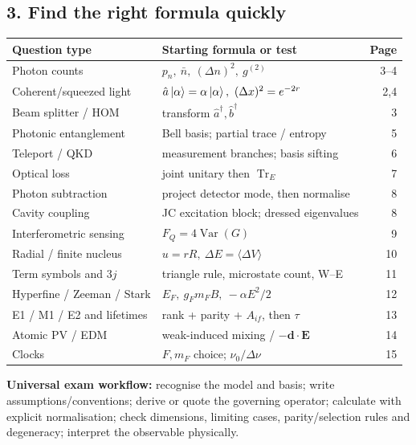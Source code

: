 \subsection*{3. Find the right formula quickly}
\begin{center}\small
\begin{tabularx}{\linewidth}{@{}lXr@{}}\toprule
Question type & Starting formula or test & Page\\\midrule
Photon counts & \(p_n,\ \bar n,\ (\Delta n)^2,\ g^{(2)}\) & 3--4\\
Coherent/squeezed light & \(\hat a\left\lvert \alpha\right\rangle=\alpha\left\lvert \alpha\right\rangle,\ (\Delta x)^2=e^{-2r}\) & 2,4\\
Beam splitter / HOM & transform \(\hat a^\dagger,\hat b^\dagger\) & 3\\
Photonic entanglement & Bell basis; partial trace / entropy & 5\\
Teleport / QKD & measurement branches; basis sifting & 6\\
Optical loss & joint unitary then \(\operatorname{Tr}_E\) & 7\\
Photon subtraction & project detector mode, then normalise & 8\\
Cavity coupling & JC excitation block; dressed eigenvalues & 8\\
Interferometric sensing & \(F_Q=4\operatorname{Var}(G)\) & 9\\
Radial / finite nucleus & \(u=rR,\ \Delta E=\langle\Delta V\rangle\) & 10\\
Term symbols and \(3j\) & triangle rule, microstate count, W--E & 11\\
Hyperfine / Zeeman / Stark & \(E_F,\ g_Fm_FB,\ -\alpha E^2/2\) & 12\\
E1 / M1 / E2 and lifetimes & rank + parity + \(A_{if}\), then \(\tau\) & 13\\
Atomic PV / EDM & weak-induced mixing / \(-\mathbf d\cdot\mathbf E\) & 14\\
Clocks & \(F,m_F\) choice; \(\nu_0/\Delta\nu\) & 15\\\bottomrule
\end{tabularx}
\end{center}
\begin{methodbox}
\textbf{Universal exam workflow:} recognise the model and basis;
write assumptions/conventions; derive or quote the governing operator;
calculate with explicit normalisation; check dimensions,
limiting cases, parity/selection rules and degeneracy;
interpret the observable physically.
\end{methodbox}
